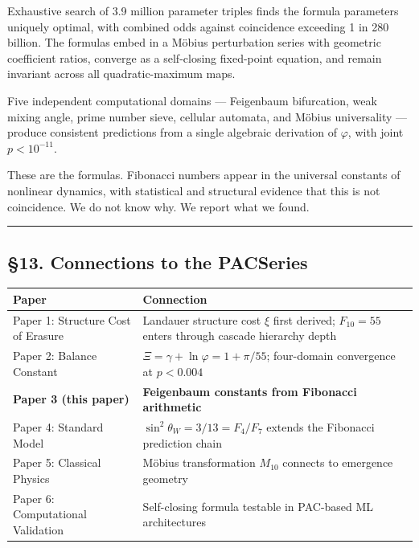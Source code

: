 \documentclass[
  11pt,
  a4paper]{article}
\begin{document}
Exhaustive search of 3.9 million parameter triples finds the formula
parameters uniquely optimal, with combined odds against coincidence
exceeding 1 in 280 billion. The formulas embed in a Möbius perturbation
series with geometric coefficient ratios, converge as a self-closing
fixed-point equation, and remain invariant across all quadratic-maximum
maps.

Five independent computational domains --- Feigenbaum bifurcation, weak
mixing angle, prime number sieve, cellular automata, and Möbius
universality --- produce consistent predictions from a single algebraic
derivation of \(\varphi\), with joint \(p < 10^{-11}\).

These are the formulas. Fibonacci numbers appear in the universal
constants of nonlinear dynamics, with statistical and structural
evidence that this is not coincidence. We do not know why. We report
what we found.

\begin{center}\rule{0.5\linewidth}{0.5pt}\end{center}

\subsection{§13. Connections to the
PACSeries}\label{connections-to-the-pacseries}

\begin{longtable}[]{@{}
  >{\raggedright\arraybackslash}p{}
  >{\raggedright\arraybackslash}p{}@{}}
\toprule\noalign{}
\begin{minipage}[b]{\linewidth}\raggedright
Paper
\end{minipage} & \begin{minipage}[b]{\linewidth}\raggedright
Connection
\end{minipage} \\
\midrule\noalign{}
\endhead
\bottomrule\noalign{}
\endlastfoot
Paper 1: Structure Cost of Erasure & Landauer structure cost \(\xi\)
first derived; \(F_{10} = 55\) enters through cascade hierarchy depth \\
Paper 2: Balance Constant & \(\Xi = \gamma + \ln\varphi = 1 + \pi/55\);
four-domain convergence at \(p < 0.004\) \\
\textbf{Paper 3 (this paper)} & \textbf{Feigenbaum constants from
Fibonacci arithmetic} \\
Paper 4: Standard Model & \(\sin^2\theta_W = 3/13 = F_4/F_7\) extends
the Fibonacci prediction chain \\
Paper 5: Classical Physics & Möbius transformation \(M_{10}\) connects
to emergence geometry \\
Paper 6: Computational Validation & Self-closing formula testable in
PAC-based ML architectures \\
\end{longtable}
\end{document}
